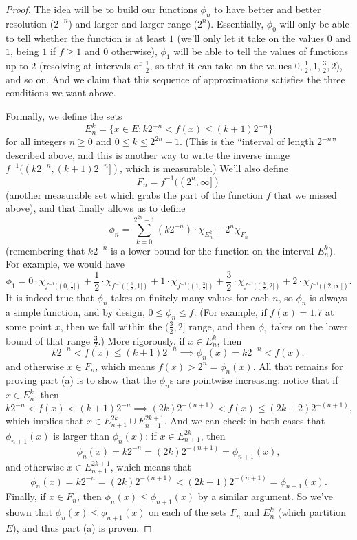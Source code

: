 \begin{proof}
The idea will be to build our functions $\phi_n$ to have better and better resolution ($2^{-n}$) and larger and larger range ($2^n$). Essentially, $\phi_0$ will only be able to tell whether the function is at least $1$ (we'll only let it take on the values $0$ and $1$, being $1$ if $f \ge 1$ and $0$ otherwise), $\phi_1$ will be able to tell the values of functions up to $2$ (resolving at intervals of $\frac{1}{2}$, so that it can take on the values $0, \frac{1}{2}, 1, \frac{3}{2}, 2$), and so on. And we claim that this sequence of approximations satisfies the three conditions we want above.

Formally, we define the sets
\[
    E_n^k = \{x \in E: k2^{-n} < f(x) \le (k+1) 2^{-n}\}
\]
for all integers $n \ge 0$ and $0 \le k \le 2^{2n} - 1$. (This is the ``interval of length $2^{-n}$'' described above, and this is another way to write the inverse image $f^{-1}((k 2^{-n}, (k+1)2^{-n}])$, which is measurable.) We'll also define 
\[
    F_n = f^{-1}((2^n, \infty])
\]
(another measurable set which grabs the part of the function $f$ that we missed above), and that finally allows us to define 
\[
    \phi_n = \sum_{k=0}^{2^{2n} - 1} (k2^{-n}) \cdot \chi_{E_n^k} + 2^n \chi_{F_n}
\]
(remembering that $k2^{-n}$ is a lower bound for the function on the interval $E_n^k$). For example, we would have
\[
    \phi_1 = 0 \cdot \chi_{f^{-1}((0, \frac{1}{2}])} + \frac{1}{2} \cdot \chi_{f^{-1}((\frac{1}{2}, 1])} + 1 \cdot \chi_{f^{-1}((1, \frac{3}{2}])} + \frac{3}{2} \cdot \chi_{f^{-1}((\frac{3}{2}, 2])} + 2 \cdot \chi_{f^{-1}((2, \infty])}.
\]
It is indeed true that $\phi_n$ takes on finitely many values for each $n$, so $\phi_n$ is always a simple function, and by design, $0 \le \phi_n \le f$. (For example, if $f(x) = 1.7$ at some point $x$, then we fall within the $(\frac{3}{2}, 2]$ range, and then $\phi_1$ takes on the lower bound of that range $\frac{3}{2}$.) More rigorously, if $x \in E_n^k$, then 
\[
    k2^{-n} < f(x) \le (k+1) 2^{-n} \implies \phi_n(x) = k2^{-n} < f(x),
\]
and otherwise $x \in F_n$, which means $f(x) > 2^n = \phi_n(x)$. All that remains for proving part (a) is to show that the $\phi_n$s are pointwise increasing: notice that if $x \in E_n^k$, then
\[
    k2^{-n} < f(x) < (k+1)2^{-n} \implies (2k) 2^{-(n+1)} < f(x) \le (2k+2) 2^{-(n+1)}, 
\]
which implies that $x \in E_{n+1}^{2k} \cup E_{n+1}^{2k+1}$. And we can check in both cases that $\phi_{n+1}(x)$ is larger than $\phi_n(x)$: if $x \in E_{n+1}^{2k}$, then 
\[
    \phi_n(x) = k2^{-n} = (2k) 2^{-(n+1)} = \phi_{n+1}(x),
\]
and otherwise $x \in E_{n+1}^{2k+1}$, which means that 
\[
    \phi_n(x) = k2^{-n} = (2k) 2^{-(n+1)} < (2k+1) 2^{-(n+1)} = \phi_{n+1}(x).
\]
Finally, if $x \in F_n$, then $\phi_n(x) \le \phi_{n+1}(x)$ by a similar argument. So we've shown that $\phi_n(x) \le \phi_{n+1}(x)$ on each of the sets $F_n$ and $E_n^k$ (which partition $E$), and thus part (a) is proven. 


\end{proof}
